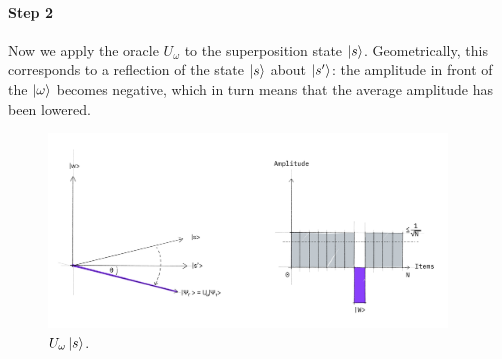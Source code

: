 \documentclass{article}
\begin{document}
\paragraph{Step 2}
Now we apply the oracle $U_\omega$ to the superposition state
$\ket{s}$.
Geometrically, this corresponds to a reflection of the state $\ket{s}$
about $\ket{s'}$: the amplitude in front of the $\ket{\omega}$ becomes
negative, which in turn means that the average amplitude has been lowered.
\begin{figure}[H]
  \centering
  \includegraphics[width=300pt]{Img/grover-step2.jpg}
  \caption{$U_\omega \ket{s}$.}
\end{figure}
\end{document}
